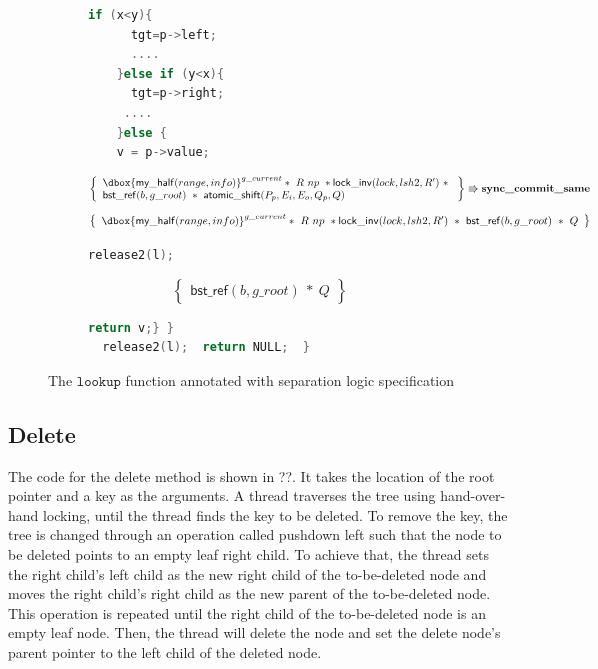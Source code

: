 \documentclass[acmsmall,screen]{acmart}\settopmatter{printfolios=true}
\newcommand\dboxed[1]{\dbox{\ensuremath{#1}}}
\newcommand{\ghost}[2]{\ensuremath{\dboxed{#1}^{#2}}}
\newcommand{\nodeboxrep}{\ensuremath{\mathsf{bst\_ref}}}
\begin{document}
\begin{figure}[htp]
\begin{subfigure}[t]{1\textwidth}
\begin{lstlisting}[language = C,  numbers = none]
    if (x<y){
      tgt=p->left;
      ....
    }else if (y<x){
      tgt=p->right;
     ....
    }else {
    v = p->value;
           \end{lstlisting} 
  $$\left\{\begin{array}{l} \ghost{\mathsf{my\_half}(range,info)}{g\_current}*\ R\ np\ *\mathsf{lock\_inv}(lock,lsh2,R')\ *\ \\\nodeboxrep(b,g\_root)\ *\ \mathsf{atomic\_shift}(P_p,E_i,E_o,Q_p,Q)\end{array}\right\} \Rrightarrow{\textbf{sync\_commit\_same}}$$
$$\left\{\begin{array}{l} \ghost{\mathsf{my\_half}(range,info)}{g\_current}*\ R\ np\ *\mathsf{lock\_inv}(lock,lsh2,R')\ *\ \nodeboxrep(b,g\_root)\ *\ Q\end{array}\right\}$$
        \begin{lstlisting}[language = C,  numbers = none]
      release2(l);
         \end{lstlisting}
       $$\left\{\begin{array}{l} \nodeboxrep(b,g\_root)\ *\ Q\end{array}\right\}$$
         \begin{lstlisting}[language = C, numbers = none]
       return v;} }
  release2(l);  return NULL;  }
 \end{lstlisting} 
\end{subfigure}
\caption{The $\texttt{lookup}$ function annotated with separation logic specification}
\label{lookupproof}
\end{figure} 

\subsection{Delete}

The code for the delete method is shown in ??. It takes the location of the root pointer
and a key as the arguments. A thread traverses the tree using hand-over-hand locking,
until the thread finds the key to be deleted. To remove the key, the tree is changed 
through an operation called pushdown left such that the node to be deleted points to an empty leaf
right child. To achieve that, the thread sets the right child's left child as the 
new right child of the to-be-deleted node and moves the right child's right child as 
the new parent of the to-be-deleted node. This operation is repeated until the right
child of the to-be-deleted node is an empty leaf node. Then, the thread will delete
the node and set the delete node's parent pointer to the left child of the deleted node.
\end{document}
